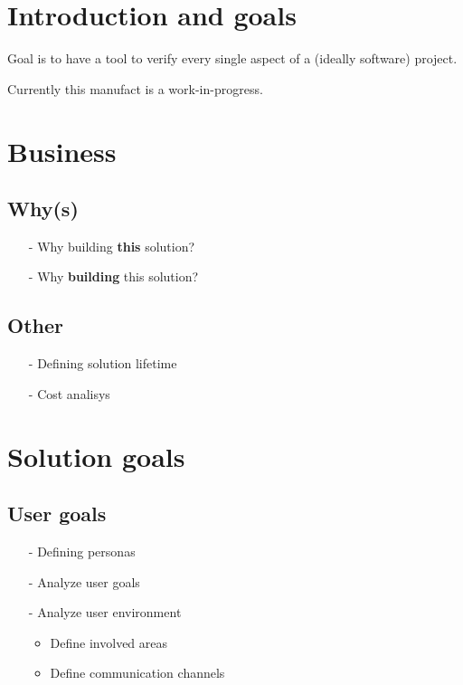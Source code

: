 \documentclass[
	fontsize=10pt, %
	twoside=false, %
	secnumdepth=1, %
]{kaobook}
\begin{document}
\mainmatter %

\chapter{Introduction and goals}
Goal is to have a tool to verify every single aspect of a (ideally software) project.

Currently this manufact is a work-in-progress.

\chapter{Business}

	\section{Why(s)}
		\begin{itemize}
			\item[-] Why building \textbf{this} solution?
			\item[-] Why \textbf{building} this solution?
		\end{itemize}

		\section{Other}
		\begin{itemize}
			\item[-] Defining solution lifetime
			\item[-] Cost analisys
		\end{itemize}

\chapter{Solution goals}

\section{User goals}
	\begin{itemize}
		\item[-] Defining personas
		\item[-] Analyze user goals
		\item[-] Analyze user environment
		\begin{itemize}
			\item Define involved areas
			\item Define communication channels
		\end{itemize}
	\end{itemize}
\end{document}
